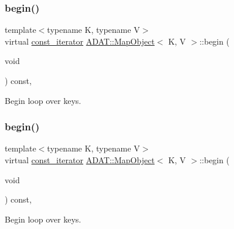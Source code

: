 \subsubsection{\texorpdfstring{begin()}{begin()}\hspace{0.1cm}{\footnotesize\ttfamily [2/3]}}
{\footnotesize\ttfamily template$<$typename K, typename V$>$ \\
virtual \mbox{\hyperlink{classADAT_1_1MapObject_a4622cd7d3b6fed18fe226d28091cc6c8}{const\+\_\+iterator}} \mbox{\hyperlink{classADAT_1_1MapObject}{A\+D\+A\+T\+::\+Map\+Object}}$<$ K, V $>$\+::begin (\begin{DoxyParamCaption}\item[{void}]{ }\end{DoxyParamCaption}) const\hspace{0.3cm}{\ttfamily [inline]}, {\ttfamily [virtual]}}



Begin loop over keys. 

\mbox{\label{classADAT_1_1MapObject_a7f4f6830f0efcc2fcd7bb2aebe0b0c95}} 
\subsubsection{\texorpdfstring{begin()}{begin()}\hspace{0.1cm}{\footnotesize\ttfamily [3/3]}}
{\footnotesize\ttfamily template$<$typename K, typename V$>$ \\
virtual \mbox{\hyperlink{classADAT_1_1MapObject_a4622cd7d3b6fed18fe226d28091cc6c8}{const\+\_\+iterator}} \mbox{\hyperlink{classADAT_1_1MapObject}{A\+D\+A\+T\+::\+Map\+Object}}$<$ K, V $>$\+::begin (\begin{DoxyParamCaption}\item[{void}]{ }\end{DoxyParamCaption}) const\hspace{0.3cm}{\ttfamily [inline]}, {\ttfamily [virtual]}}



Begin loop over keys. 

\mbox{\label{classADAT_1_1MapObject_ad4a8a70a7c12d4bdc488d6eac20388a1}} 
